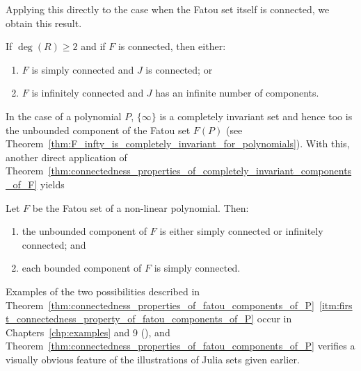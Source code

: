 Applying this directly to the case when the Fatou set itself is connected, we
obtain this result.

\begin{corollary}
    If $\deg(R) \geq 2$ and if $F$ is connected, then either:
    \begin{enumerate}[label=(\roman*)]
        \item $F$ is simply connected and $J$ is connected; or
        \item $F$ is infinitely connected and $J$ has an infinite number of
        components.
    \end{enumerate}
\end{corollary}

In the case of a polynomial $P$, $\{\infty\}$ is a completely invariant set and
hence too is the unbounded component of the Fatou set $F(P)$ (see
Theorem~\ref{thm:F_infty_is_completely_invariant_for_polynomials}). With this,
another direct application of
Theorem~\ref{thm:connectedness_properties_of_completely_invariant_components_of_F}
yields

\begin{theorem}
    \label{thm:connectedness_properties_of_fatou_components_of_P}
    Let $F$ be the Fatou set of a non-linear polynomial. Then:
    \begin{enumerate}[label=(\roman*)]
        \item \label{itm:first_connectedness_property_of_fatou_components_of_P}
        the unbounded component of $F$ is either simply connected or infinitely
        connected; and
        \item \label{itm:second_connectedness_property_of_fatou_components_of_P}
        each bounded component of $F$ is simply connected.
    \end{enumerate}
\end{theorem}

Examples of the two possibilities described in
Theorem~\ref{thm:connectedness_properties_of_fatou_components_of_P}~\ref{itm:first_connectedness_property_of_fatou_components_of_P}
occur in Chapters~\ref{chp:examples} and 9 (\cite[192--245]{Beardon1991}), and
Theorem~\ref{thm:connectedness_properties_of_fatou_components_of_P} verifies a
visually obvious feature of the illustrations of Julia sets given earlier.

